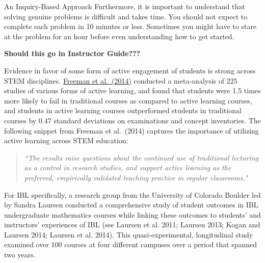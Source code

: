 \begin{section}{An Inquiry-Based Approach}
Furthermore, it is important to understand that solving genuine problems is difficult and takes time.  You should not expect to complete each problem in 10 minutes or less.  Sometimes you might have to stare at the problem for an hour before even understanding how to get started.



\textbf{Should this go in Instructor Guide???}

Evidence in favor of some form of active engagement of students is strong across STEM disciplines. \href{???}{Freeman et al.~(2014)} conducted a meta-analysis of 225 studies of various forms of active learning, and found that students were 1.5 times more likely to fail in traditional courses as compared to active learning courses, and students in active learning courses outperformed students in traditional courses by 0.47 standard deviations on examinations and concept inventories. The following snippet from Freeman et al.~(2014) captures the importance of utilizing active learning across STEM education:
\begin{quote}
\emph{``The results raise questions about the continued use of traditional lecturing as a control in research studies, and support active learning as the preferred, empirically validated teaching practice in regular classrooms."}
\end{quote}

For IBL specifically, a research group from the University of Colorado Boulder led by Sandra Laursen conducted a comprehensive study of student outcomes in IBL undergraduate mathematics courses while linking these outcomes to students' and instructors' experiences of IBL (see Laursen et al. 2011; Laursen 2013; Kogan and Laursen 2014; Laursen et al. 2014). This quasi-experimental, longitudinal study examined over 100 courses at four different campuses over a period that spanned two years.


\end{section}
